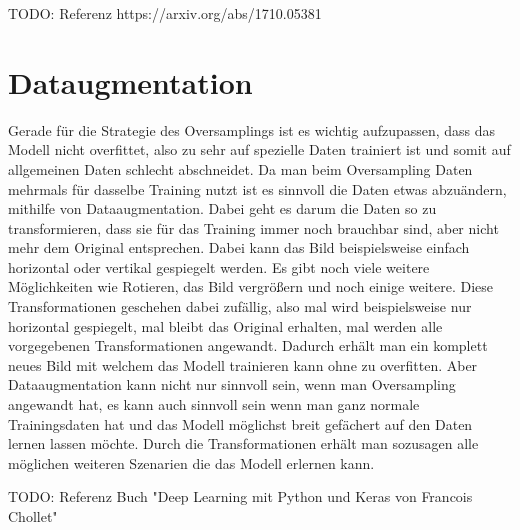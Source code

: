 \documentclass[11pt, a4paper]{article}
\begin{document}
TODO: Referenz https://arxiv.org/abs/1710.05381


\section{Dataugmentation}
Gerade für die Strategie des Oversamplings ist es wichtig aufzupassen, dass das Modell nicht overfittet, also zu sehr auf spezielle Daten trainiert ist und somit auf allgemeinen Daten schlecht abschneidet. Da man beim Oversampling Daten mehrmals für dasselbe Training nutzt ist es sinnvoll die Daten etwas abzuändern, mithilfe von Dataaugmentation. Dabei geht es darum die Daten so zu transformieren, dass sie für das Training immer noch brauchbar sind, aber nicht mehr dem Original entsprechen. Dabei kann das Bild beispielsweise einfach horizontal oder vertikal gespiegelt werden. Es gibt noch viele weitere Möglichkeiten wie Rotieren, das Bild vergrößern und noch einige weitere. Diese Transformationen geschehen dabei zufällig, also mal wird beispielsweise nur horizontal gespiegelt, mal bleibt das Original erhalten, mal werden alle vorgegebenen Transformationen angewandt. Dadurch erhält man ein komplett neues Bild mit welchem das Modell trainieren kann ohne zu overfitten. Aber Dataaugmentation kann nicht nur sinnvoll sein, wenn man Oversampling angewandt hat, es kann auch sinnvoll sein wenn man ganz normale Trainingsdaten hat und das Modell möglichst breit gefächert auf den Daten lernen lassen möchte. Durch die Transformationen erhält man sozusagen alle möglichen weiteren Szenarien die das Modell erlernen kann.

TODO: Referenz Buch "Deep Learning mit Python und Keras von Francois Chollet"
\end{document}
